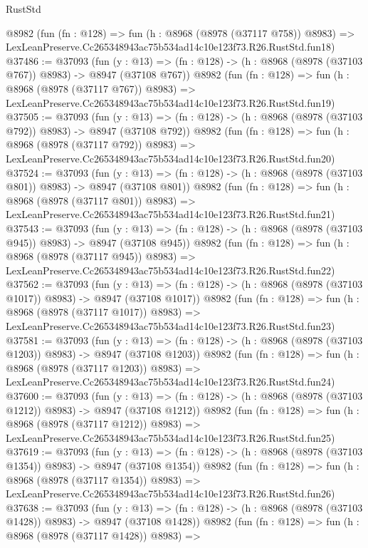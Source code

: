 \begin{lexlean}{RustStd}
\begin{coremodule}
    @8982
    (fun (fn : @128) =>
    fun (h : @8968 (@8978 (@37117 @758)) @8983) =>
    LexLeanPreserve.Cc265348943ac75b534ad14c10e123f73.R26.RustStd.fun18)
@37486 := @37093
    (fun (y : @13) => (fn : @128) -> (h : @8968 (@8978 (@37103 @767)) @8983) -> @8947 (@37108 @767))
    @8982
    (fun (fn : @128) =>
    fun (h : @8968 (@8978 (@37117 @767)) @8983) =>
    LexLeanPreserve.Cc265348943ac75b534ad14c10e123f73.R26.RustStd.fun19)
@37505 := @37093
    (fun (y : @13) => (fn : @128) -> (h : @8968 (@8978 (@37103 @792)) @8983) -> @8947 (@37108 @792))
    @8982
    (fun (fn : @128) =>
    fun (h : @8968 (@8978 (@37117 @792)) @8983) =>
    LexLeanPreserve.Cc265348943ac75b534ad14c10e123f73.R26.RustStd.fun20)
@37524 := @37093
    (fun (y : @13) => (fn : @128) -> (h : @8968 (@8978 (@37103 @801)) @8983) -> @8947 (@37108 @801))
    @8982
    (fun (fn : @128) =>
    fun (h : @8968 (@8978 (@37117 @801)) @8983) =>
    LexLeanPreserve.Cc265348943ac75b534ad14c10e123f73.R26.RustStd.fun21)
@37543 := @37093
    (fun (y : @13) => (fn : @128) -> (h : @8968 (@8978 (@37103 @945)) @8983) -> @8947 (@37108 @945))
    @8982
    (fun (fn : @128) =>
    fun (h : @8968 (@8978 (@37117 @945)) @8983) =>
    LexLeanPreserve.Cc265348943ac75b534ad14c10e123f73.R26.RustStd.fun22)
@37562 := @37093
    (fun (y : @13) =>
    (fn : @128) -> (h : @8968 (@8978 (@37103 @1017)) @8983) -> @8947 (@37108 @1017))
    @8982
    (fun (fn : @128) =>
    fun (h : @8968 (@8978 (@37117 @1017)) @8983) =>
    LexLeanPreserve.Cc265348943ac75b534ad14c10e123f73.R26.RustStd.fun23)
@37581 := @37093
    (fun (y : @13) =>
    (fn : @128) -> (h : @8968 (@8978 (@37103 @1203)) @8983) -> @8947 (@37108 @1203))
    @8982
    (fun (fn : @128) =>
    fun (h : @8968 (@8978 (@37117 @1203)) @8983) =>
    LexLeanPreserve.Cc265348943ac75b534ad14c10e123f73.R26.RustStd.fun24)
@37600 := @37093
    (fun (y : @13) =>
    (fn : @128) -> (h : @8968 (@8978 (@37103 @1212)) @8983) -> @8947 (@37108 @1212))
    @8982
    (fun (fn : @128) =>
    fun (h : @8968 (@8978 (@37117 @1212)) @8983) =>
    LexLeanPreserve.Cc265348943ac75b534ad14c10e123f73.R26.RustStd.fun25)
@37619 := @37093
    (fun (y : @13) =>
    (fn : @128) -> (h : @8968 (@8978 (@37103 @1354)) @8983) -> @8947 (@37108 @1354))
    @8982
    (fun (fn : @128) =>
    fun (h : @8968 (@8978 (@37117 @1354)) @8983) =>
    LexLeanPreserve.Cc265348943ac75b534ad14c10e123f73.R26.RustStd.fun26)
@37638 := @37093
    (fun (y : @13) =>
    (fn : @128) -> (h : @8968 (@8978 (@37103 @1428)) @8983) -> @8947 (@37108 @1428))
    @8982
    (fun (fn : @128) =>
    fun (h : @8968 (@8978 (@37117 @1428)) @8983) =>

\end{coremodule}
\end{lexlean}

